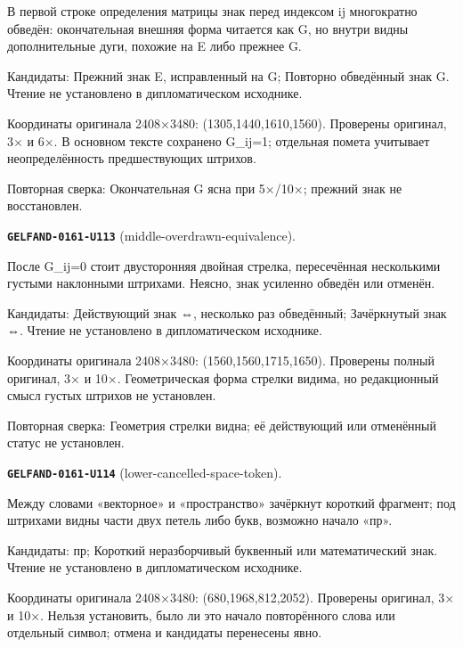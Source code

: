 В первой строке определения матрицы знак перед индексом ij многократно обведён: окончательная внешняя форма читается как G, но внутри видны дополнительные дуги, похожие на E либо прежнее G.\par
Кандидаты: Прежний знак E, исправленный на G; Повторно обведённый знак G. Чтение не установлено в дипломатическом исходнике.\par
Координаты оригинала 2408×3480: (1305,1440,1610,1560). Проверены оригинал, 3× и 6×. В основном тексте сохранено G\_ij=1; отдельная помета учитывает неопределённость предшествующих штрихов.\par
Повторная сверка: Окончательная G ясна при 5×/10×; прежний знак не восстановлен.\par\medskip
\par\noindent\leavevmode{}\label{GELFAND-0161-U113}\label{GELFAND-P001488:middle-overdrawn-equivalence}\textbf{\texttt{GELFAND-0161-U113}} (middle-overdrawn-equivalence).\nopagebreak[4]\par
После G\_ij=0 стоит двусторонняя двойная стрелка, пересечённая несколькими густыми наклонными штрихами. Неясно, знак усиленно обведён или отменён.\par
Кандидаты: Действующий знак ⇔, несколько раз обведённый; Зачёркнутый знак ⇔. Чтение не установлено в дипломатическом исходнике.\par
Координаты оригинала 2408×3480: (1560,1560,1715,1650). Проверены полный оригинал, 3× и 10×. Геометрическая форма стрелки видима, но редакционный смысл густых штрихов не установлен.\par
Повторная сверка: Геометрия стрелки видна; её действующий или отменённый статус не установлен.\par\medskip
\par\noindent\leavevmode{}\label{GELFAND-0161-U114}\label{GELFAND-P001488:lower-cancelled-space-token}\textbf{\texttt{GELFAND-0161-U114}} (lower-cancelled-space-token).\nopagebreak[4]\par
Между словами «векторное» и «пространство» зачёркнут короткий фрагмент; под штрихами видны части двух петель либо букв, возможно начало «пр».\par
Кандидаты: пр; Короткий неразборчивый буквенный или математический знак. Чтение не установлено в дипломатическом исходнике.\par
Координаты оригинала 2408×3480: (680,1968,812,2052). Проверены оригинал, 3× и 10×. Нельзя установить, было ли это начало повторённого слова или отдельный символ; отмена и кандидаты перенесены явно.\par
